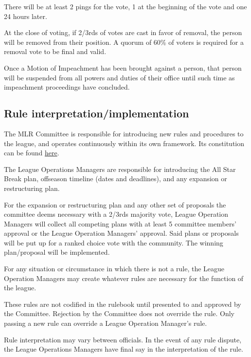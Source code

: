 \begin{deepEnumerate}
\begin{deepEnumerate}
\begin{deepEnumerate}
			There will be at least 2 pings for the vote, 1 at the beginning of the vote and one 24 hours later.
			\item At the close of voting, if 2/3rds of votes are cast in favor of removal, the person will be removed from their position. 
			A quorum of 60\% of voters is required for a removal vote to be final and valid.
		\end{deepEnumerate}
		\item Once a Motion of Impeachment has been brought against a person, that person will be suspended from all powers and duties of their office 
		until such time as impeachment proceedings have concluded.
	\end{deepEnumerate}
\end{deepEnumerate}

\subsection{Rule interpretation/implementation}
\begin{deepEnumerate}
	\item The MLR Committee is responsible for introducing new rules and procedures to the league, and operates continuously within its own framework.
	Its constitution can be found \hyperref[sec:Committee Constitution]{here}.
	\item The League Operations Managers are responsible for introducing the All Star Break plan, offseason timeline (dates and deadlines), and any expansion or restructuring plan.
	\begin{deepEnumerate}
		\item For the expansion or restructuring plan and any other set of proposals the committee deems necessary with a 2/3rds majority vote, League Operation Managers
		will collect all competing plans with at least 5 committee members' approval or the League Operation Managers' approval.
		Said plans or proposals will be put up for a ranked choice vote with the community. The winning plan/proposal will be implemented.
	\end{deepEnumerate}
	\item For any situation or circumstance in which there is not a rule, the League Operation Managers may create whatever rules are necessary
	for the function of the league.
	\begin{deepEnumerate}
		\item These rules are not codified in the rulebook until presented to and approved by the Committee.
		Rejection by the Committee does not override the rule. Only passing a new rule can override a League Operation Manager's rule.
	\end{deepEnumerate}
	\item Rule interpretation may vary between officials. In the event of any rule dispute, the League Operations Managers have final say in the interpretation of the rule.
\end{deepEnumerate}

